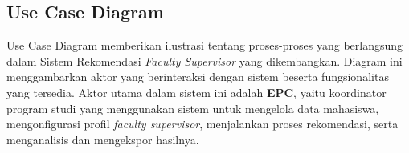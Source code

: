 
\subsection{Use Case Diagram}\label{use-case-diagram}

Use Case Diagram memberikan ilustrasi tentang proses-proses yang berlangsung
dalam Sistem Rekomendasi \textit{Faculty Supervisor} yang dikembangkan.
Diagram ini menggambarkan aktor yang berinteraksi dengan sistem beserta
fungsionalitas yang tersedia. Aktor utama dalam sistem ini adalah \textbf{EPC},
yaitu koordinator program studi yang menggunakan sistem untuk mengelola data
mahasiswa, mengonfigurasi profil \textit{faculty supervisor}, menjalankan
proses rekomendasi, serta menganalisis dan mengekspor hasilnya.

